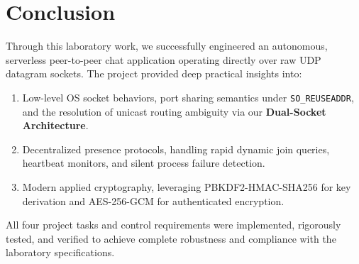 \documentclass[11pt,a4paper]{article}
\begin{document}
\section{Conclusion}

Through this laboratory work, we successfully engineered an autonomous, serverless peer-to-peer chat application operating directly over raw UDP datagram sockets. The project provided deep practical insights into:
\begin{enumerate}[noitemsep]
    \item Low-level OS socket behaviors, port sharing semantics under \texttt{SO\_REUSEADDR}, and the resolution of unicast routing ambiguity via our \textbf{Dual-Socket Architecture}.
    \item Decentralized presence protocols, handling rapid dynamic join queries, heartbeat monitors, and silent process failure detection.
    \item Modern applied cryptography, leveraging PBKDF2-HMAC-SHA256 for key derivation and AES-256-GCM for authenticated encryption.
\end{enumerate}
All four project tasks and control requirements were implemented, rigorously tested, and verified to achieve complete robustness and compliance with the laboratory specifications.
\end{document}
